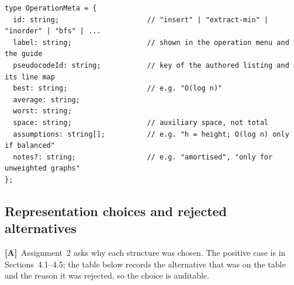 \documentclass[11pt,a4paper]{article}
\newcommand{\A}{\textcolor{asmc}{\textbf{[A]}}}     %
\newcommand{\ct}[1]{\texttt{#1}}
\begin{document}
\begin{lstlisting}[style=ts,caption={The complexity metadata record. One record per
\ct{(structure, operation)} is the single source of the menu label, the guide text, the pseudocode
identifier and the displayed bound.},label={lst:opmeta}]
type OperationMeta = {
  id: string;                     // "insert" | "extract-min" | "inorder" | "bfs" | ...
  label: string;                  // shown in the operation menu and the guide
  pseudocodeId: string;           // key of the authored listing and its line map
  best: string;                   // e.g. "O(log n)"
  average: string;
  worst: string;
  space: string;                  // auxiliary space, not total
  assumptions: string[];          // e.g. "h = height; O(log n) only if balanced"
  notes?: string;                 // e.g. "amortised", "only for unweighted graphs"
};
\end{lstlisting}

\subsection{Representation choices and rejected alternatives}

\A\ Assignment~2 asks why each structure was chosen. The positive case is in Sections~4.1--4.5;
the table below records the alternative that was on the table and the reason it was rejected, so
the choice is auditable.
\end{document}
